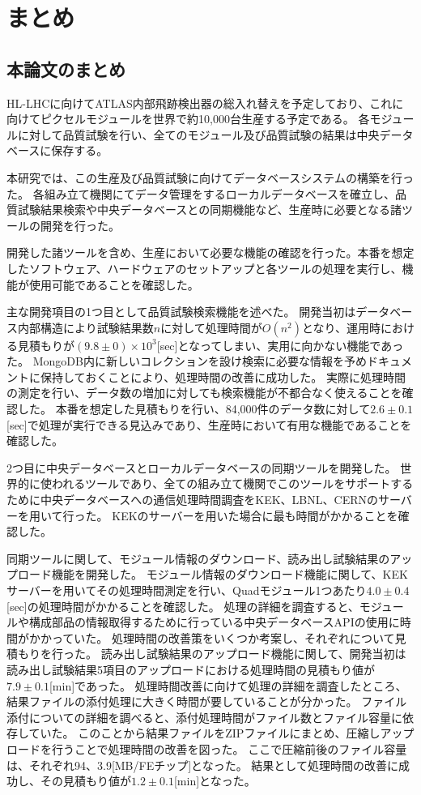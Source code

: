 \chapter{まとめ}

\section{本論文のまとめ}
HL-LHCに向けてATLAS内部飛跡検出器の総入れ替えを予定しており、これに向けてピクセルモジュールを世界で約10,000台生産する予定である。
各モジュールに対して品質試験を行い、全てのモジュール及び品質試験の結果は中央データベースに保存する。

本研究では、この生産及び品質試験に向けてデータベースシステムの構築を行った。
各組み立て機関にてデータ管理をするローカルデータベースを確立し、品質試験結果検索や中央データベースとの同期機能など、生産時に必要となる諸ツールの開発を行った。

開発した諸ツールを含め、生産において必要な機能の確認を行った。本番を想定したソフトウェア、ハードウェアのセットアップと各ツールの処理を実行し、機能が使用可能であることを確認した。

主な開発項目の1つ目として品質試験検索機能を述べた。
開発当初はデータベース内部構造により試験結果数$n$に対して処理時間が$O(n^2)$となり、運用時における見積もりが$(9.8±0)\times 10^3$[sec]となってしまい、実用に向かない機能であった。
MongoDB内に新しいコレクションを設け検索に必要な情報を予めドキュメントに保持しておくことにより、処理時間の改善に成功した。
実際に処理時間の測定を行い、データ数の増加に対しても検索機能が不都合なく使えることを確認した。
本番を想定した見積もりを行い、84,000件のデータ数に対して$2.6\pm0.1$[sec]で処理が実行できる見込みであり、生産時において有用な機能であることを確認した。

2つ目に中央データベースとローカルデータベースの同期ツールを開発した。
世界的に使われるツールであり、全ての組み立て機関でこのツールをサポートするために中央データベースへの通信処理時間調査をKEK、LBNL、CERNのサーバーを用いて行った。
KEKのサーバーを用いた場合に最も時間がかかることを確認した。

同期ツールに関して、モジュール情報のダウンロード、読み出し試験結果のアップロード機能を開発した。
モジュール情報のダウンロード機能に関して、KEKサーバーを用いてその処理時間測定を行い、Quadモジュール1つあたり$4.0\pm 0.4$[sec]の処理時間がかかることを確認した。
処理の詳細を調査すると、モジュールや構成部品の情報取得するために行っている中央データベースAPIの使用に時間がかかっていた。
処理時間の改善策をいくつか考案し、それぞれについて見積もりを行った。
読み出し試験結果のアップロード機能に関して、開発当初は読み出し試験結果5項目のアップロードにおける処理時間の見積もり値が$7.9 ± 0.1$[min]であった。
処理時間改善に向けて処理の詳細を調査したところ、結果ファイルの添付処理に大きく時間が要していることが分かった。
ファイル添付についての詳細を調べると、添付処理時間がファイル数とファイル容量に依存していた。
このことから結果ファイルをZIPファイルにまとめ、圧縮しアップロードを行うことで処理時間の改善を図った。
ここで圧縮前後のファイル容量は、それぞれ94、3.9[MB/FEチップ]となった。
結果として処理時間の改善に成功し、その見積もり値が$1.2\pm 0.1$[min]となった。

